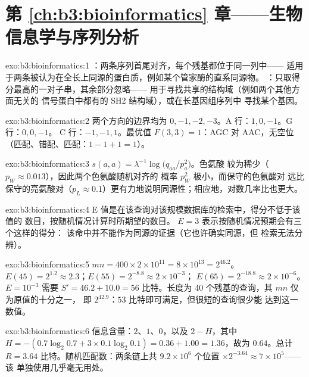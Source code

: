 \section*{第 \ref{ch:b3:bioinformatics} 章——生物信息学与序列分析}

\begin{solution}{exo:b3:bioinformatics:1}
：两条序列首尾对齐，每个残基都位于同一列中——
适用于两条被认为在全长上同源的蛋白质，例如某个管家酶的直系同源物。
：只取得分最高的一对子串，其余部分忽略——
用于寻找共享的结构域（例如两个其他方面无关的
信号蛋白中都有的 SH2 结构域），或在长基因组序列中
寻找某个基因。
\end{solution}

\begin{solution}{exo:b3:bioinformatics:2}
两个方向的边界均为 $0,-1,-2,-3$。A 行：$1, 0, -1$。G 行：$0, 0, -1$。
C 行：$-1, -1, 1$。最优值 $F(3,3) = 1$：AGC 对 AAC，无空位
（匹配、错配、匹配：$1 - 1 + 1 = 1$）。
\end{solution}

\begin{solution}{exo:b3:bioinformatics:3}
$s(a,a) = \lambda^{-1}\log\bigl(q_{aa}/p_{a}^{2}\bigr)$。色氨酸
较为稀少（$p_{W} \approx 0.013$），因此两个色氨酸随机对齐的
概率 $p_{W}^{2}$ 极小，而保守的色氨酸对
远比保守的亮氨酸对（$p_{L}
\approx 0.1$）更有力地说明同源性；相应地，对数几率比也更大。
\end{solution}

\begin{solution}{exo:b3:bioinformatics:4}
E 值是在该查询对该规模数据库的检索中，得分不低于该值的
数目，按随机情况计算时所期望的数目。
$E = 3$ 表示按随机情况预期会有三个这样的得分：
该命中并不能作为同源的证据（它也许确实同源，但
检索无法分辨）。
\end{solution}

\begin{solution}{exo:b3:bioinformatics:5}
$mn = 400\times 2\times 10^{11} = 8\times 10^{13} = 2^{46.2}$。$E(45) =
2^{1.2} \approx 2.3$；$E(55) = 2^{-8.8} \approx 2\times 10^{-3}$；
$E(65) = 2^{-18.8} \approx 2\times 10^{-6}$。$E = 10^{-3}$ 需要 $S' =
46.2 + 10.0 = 56$ 比特。长度为 \num{40} 个残基的查询，其 $mn$ 仅为原值的十分之一，
即 $2^{42.9}$：$53$ 比特即可满足，但很短的查询很少能
达到这一数值。
\end{solution}

\begin{solution}{exo:b3:bioinformatics:6}
信息含量：$2$、$1$、$0$，以及 $2 - H$，其中 $H = -(0.7\log_{2}
0.7 + 3\times 0.1\log_{2} 0.1) = 0.36 + 1.00 = 1.36$，故为 $0.64$。总计
$R = 3.64$ 比特。随机匹配数：两条链上共 $9.2\times 10^{6}$ 个位置
$\times 2^{-3.64} \approx 7\times 10^{5}$——该
单独使用几乎毫无用处。
\end{solution}

